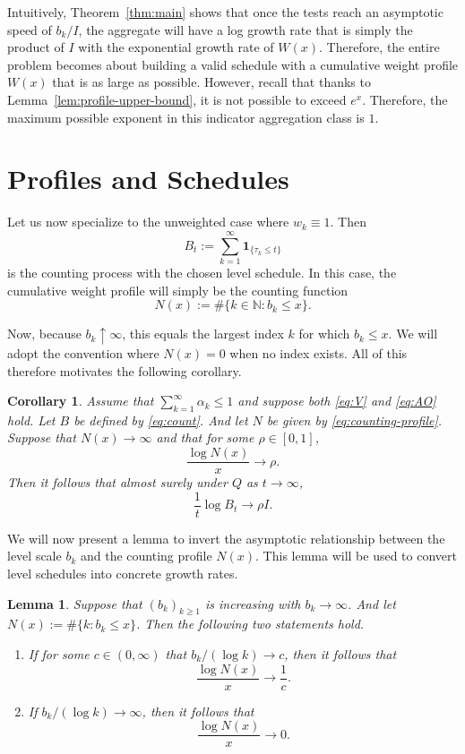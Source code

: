 \documentclass{article}
\newcommand{\NN}{\mathbb N}
\newcommand{\ind}[1]{\mathbf{1}_{\{#1\}}}
\newtheorem{lemma}[theorem]{Lemma}
\newtheorem{corollary}[theorem]{Corollary}
\theoremstyle{definition}
\begin{document}
Intuitively, Theorem~\ref{thm:main} shows that once the tests reach an asymptotic speed of $b_k/I$, the aggregate will have a log growth rate that is simply the product of $I$ with the exponential growth rate of $W(x)$. Therefore, the entire problem becomes about building a valid schedule with a cumulative weight profile $W(x)$ that is as large as possible. However, recall that thanks to Lemma~\ref{lem:profile-upper-bound}, it is not possible to exceed $e^x$. Therefore, the maximum possible exponent in this indicator aggregation class is $1$.

\section{Profiles and Schedules}\label{sec:cuter}
Let us now specialize to the unweighted case where $w_k\equiv 1$. Then
\begin{equation}\label{eq:count}
B_t:=\sum_{k=1}^\infty \ind{\tau_k\le t}    
\end{equation}
is the counting process with the chosen level schedule. In this case, the cumulative weight profile will simply be the counting function
\begin{equation}\label{eq:counting-profile}
N(x):=\#\{k\in\NN: b_k\le x\}.    
\end{equation}

Now, because $b_k\uparrow \infty$, this equals the largest index $k$ for which $b_k\le x$. We will adopt the convention where $N(x)=0$ when no index exists. All of this therefore motivates the following corollary.

\begin{corollary}\label{cor:unweighted}
Assume that $\sum_{k=1}^{\infty}\alpha_k\le 1$ and suppose both \eqref{eq:V} and \eqref{eq:AO} hold. Let $B$ be defined by \eqref{eq:count}. And let $N$ be given by \eqref{eq:counting-profile}. Suppose that $N(x)\to\infty$ and that for some $\rho\in[0,1]$,
\[
\frac{\log N(x)}{x}\longrightarrow \rho.
\]
Then it follows that almost surely under $Q$ as $t\to\infty$,
\[
\frac{1}{t}\log B_t\longrightarrow \rho I.
\]
\end{corollary}

We will now present a lemma to invert the asymptotic relationship between the level scale $b_k$ and the counting profile $N(x)$. This lemma will be used to convert level schedules into concrete growth rates.

\begin{lemma}\label{lem:inversion}
Suppose that $(b_k)_{k\ge 1}$ is increasing with $b_k\to\infty$. And let $N(x):=\#\{k:b_k\le x\}$. Then the following two statements hold.
\begin{enumerate}
    \item If for some $c\in(0,\infty)$ that $b_k/(\log k)\to c$, then it follows that
    \[
    \frac{\log N(x)}{x}\longrightarrow \frac{1}{c}.
    \]
    \item If $b_k/(\log k)\to\infty$, then it follows that
    \[
    \frac{\log N(x)}{x}\longrightarrow 0.
    \]
\end{enumerate}
\end{lemma}
\end{document}
